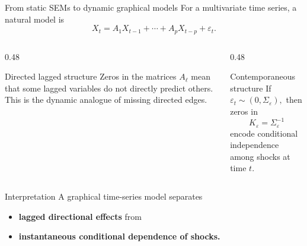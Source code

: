 \documentclass[dvipsnames,aspectratio=169,handout]{beamer}
\begin{document}
\begin{frame}{From static SEMs to dynamic graphical models}
For a multivariate time series, a natural model is
\[
X_t = A_1X_{t-1}+\cdots + A_pX_{t-p}+\varepsilon_t.
\]

\begin{columns}[T]
\begin{column}{0.48\textwidth}
\begin{block}{Directed lagged structure}
Zeros in the matrices $A_\ell$ mean that some lagged variables do not directly predict others.
This is the dynamic analogue of missing directed edges.
\end{block}
\end{column}

\begin{column}{0.48\textwidth}
\begin{block}{Contemporaneous structure}
If $
\varepsilon_t\sim (0,\Sigma_\varepsilon),
$
then zeros in
\[
K_\varepsilon=\Sigma_\varepsilon^{-1}
\]
encode conditional independence among shocks at time $t$.
\end{block}
\end{column}
\end{columns}

\begin{alertblock}{Interpretation}
A graphical time-series model separates
\begin{itemize}
    \item \textbf{lagged directional effects} from
    \item \textbf{instantaneous conditional dependence of shocks.}
\end{itemize}
\end{alertblock}
\end{frame}
\end{document}

